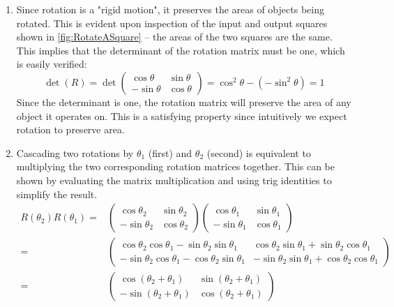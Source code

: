 \documentclass[onefignum,onetabnum]{siamart190516}
\begin{document}
\begin{enumerate}
	\item Since rotation is a "rigid motion", it preserves the areas of objects
	being rotated.  This is evident upon inspection of the
	input and output squares shown in \cref{fig:RotateASquare} -- the
	areas of the two squares are the same.
	This implies that the determinant of the rotation matrix
	must be one, which is easily verified:
	$$
	\det(R) = 
	\det \begin{pmatrix}
	\cos \theta & \sin \theta \\
	-\sin \theta & \cos \theta
	\end{pmatrix} =
	\cos^2 \theta - (-\sin^2 \theta) = 1
	$$
	Since the determinant is one, the rotation matrix will preserve
	the area of any object it operates on.  This is a satisfying property
	since intuitively we expect rotation to preserve area.
	
	\item Cascading two rotations by $\theta_1$ (first) and $\theta_2$ (second)
	is equivalent to multiplying the two
	corresponding rotation matrices together.  This can be shown by
	evaluating the matrix multiplication and using trig identities to
	simplify the result.
	\begin{align}
	R(\theta_2) R(\theta_1) =&
\begin{pmatrix}
\cos \theta_2 & \sin \theta_2 \\
-\sin \theta_2 & \cos \theta_2
\end{pmatrix}
\begin{pmatrix}
\cos \theta_1 & \sin \theta_1 \\
-\sin \theta_1 & \cos \theta_1
\end{pmatrix} \nonumber\\
=& \begin{pmatrix}
\cos \theta_2 \cos \theta_1 - \sin \theta_2 \sin \theta_1 & \cos \theta_2 \sin \theta_1  + \sin \theta_2 \cos \theta_1   \\
-\sin \theta_2 \cos \theta_1 - \cos \theta_2 \sin \theta_1 & -\sin \theta_2 \sin \theta_1 + \cos \theta_2 \cos \theta_1 
\end{pmatrix} \nonumber\\
=& \begin{pmatrix}
\cos (\theta_2 + \theta_1) & \sin (\theta_2 + \theta_1) \\
-\sin (\theta_2 + \theta_1) & \cos (\theta_2 + \theta_1)
\end{pmatrix} \nonumber
	\end{align}
	

\end{enumerate}
\end{document}
